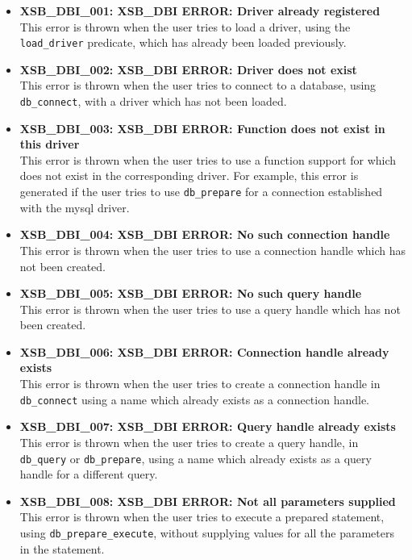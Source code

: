 \begin{itemize}

\item {\bf XSB\_DBI\_001: XSB\_DBI ERROR: Driver already registered}\\
This error is thrown when the user tries to load a driver, using the {\tt load\_driver} 
predicate, which has already been loaded previously.

\item {\bf XSB\_DBI\_002: XSB\_DBI ERROR: Driver does not exist}\\
This error is thrown when the user tries to connect to a database, using
{\tt db\_connect}, with a driver which has not been loaded.

\item {\bf XSB\_DBI\_003: XSB\_DBI ERROR: Function does not exist in this driver}\\
This error is thrown when the user tries to use a function support 
for which does not exist in the corresponding driver. For example, 
this error is generated if the user
tries to use {\tt db\_prepare} for a connection established with the
mysql driver.

\item {\bf XSB\_DBI\_004: XSB\_DBI ERROR: No such connection handle}\\
This error is thrown when the user tries to use a connection handle
which has not been created.

\item {\bf XSB\_DBI\_005: XSB\_DBI ERROR: No such query handle}\\
This error is thrown when the user tries to use a query handle which has 
not been created.

\item {\bf XSB\_DBI\_006: XSB\_DBI ERROR: Connection handle already exists}\\
This error is thrown when the user tries to create a connection handle in
{\tt db\_connect} using a name which already exists as a connection handle.

\item {\bf XSB\_DBI\_007: XSB\_DBI ERROR: Query handle already exists}\\
This error is thrown when the user tries to create a query handle, in
{\tt db\_query} or {\tt db\_prepare}, using a name which already exists as
a query handle for a different query.

\item {\bf XSB\_DBI\_008: XSB\_DBI ERROR: Not all parameters supplied}\\
This error is thrown when the user tries to execute a prepared statement,
using {\tt db\_prepare\_execute}, without supplying values for all the
parameters in the statement.


\end{itemize}
